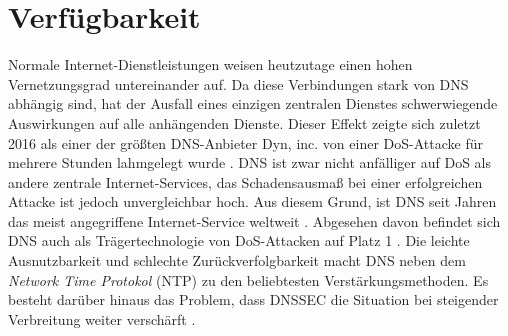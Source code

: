 \section{Verfügbarkeit}
\label{sec:Thread-DosAmp}

Normale Internet-Dienstleistungen weisen heutzutage einen hohen Vernetzungsgrad untereinander auf. Da diese Verbindungen stark von DNS abhängig sind, hat der Ausfall eines einzigen zentralen Dienstes schwerwiegende Auswirkungen auf alle anhängenden Dienste. Dieser Effekt zeigte sich zuletzt 2016 als einer der größten DNS-Anbieter Dyn, inc. von einer DoS-Attacke für mehrere Stunden lahmgelegt wurde \cite{Krebs2016}. DNS ist zwar nicht anfälliger auf DoS als andere zentrale Internet-Services, das Schadensausmaß bei einer erfolgreichen Attacke ist jedoch unvergleichbar hoch. Aus diesem Grund, ist DNS seit Jahren das meist angegriffene Internet-Service weltweit \cite{Alcoy2017}. 
Abgesehen davon befindet sich DNS auch als Trägertechnologie von DoS-Attacken auf Platz 1 \cite{Alcoy2017}. Die leichte Ausnutzbarkeit und schlechte Zurückverfolgbarkeit macht DNS neben dem \textit{Network Time Protokol} (NTP) zu den beliebtesten Verstärkungsmethoden. Es besteht darüber hinaus das Problem, dass DNSSEC die Situation bei steigender Verbreitung weiter verschärft \cite{Anagnostopoulos2013}\cite{VanRijswijk-Deij2014}.

